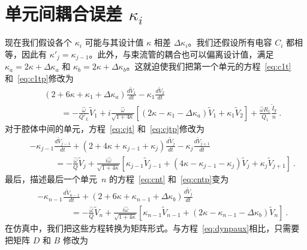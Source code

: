 \documentclass[12pt]{article}
\newcommand\tV{\tilde V}
\newcommand\ho{\hat\omega}
\newcommand\Dk{\Delta\kappa}
\begin{document}
\section{单元间耦合误差 $\kappa_i$}
\label{sec:kappa}
%
现在我们假设各个 $\kappa_i$ 可能与其设计值 $\kappa$ 相差 $\Dk_i$。我们还假设所有电容 $C_i$ 都相等，因此有 $\kappa'_j=\kappa_{j-1}$。此外，与束流管的耦合也可以偏离设计值，满足 $\kappa_a=2\kappa+\Delta\kappa_a$ 和 $\kappa_b=2\kappa+\Delta\kappa_b$。这就迫使我们把第一个单元的方程~\ref{eq:c1t} 和~\ref{eq:c1tp}修改为
\begin{eqnarray}\label{eq:c1tk}
  &&\left(2+6\kappa+\kappa_1+\Dk_a\right)\frac{d\tV_1}{dt} -\kappa_1\frac{d\tV_2}{dt}\\
  &&\qquad=-\frac{\ho}{Q'_L}\tV_1
         +i\frac{\ho}{\sqrt{1+4\kappa}}\left[(2\kappa-\kappa_1-\Dk_a)\tV_1+\kappa_1\tV_2\right]
         + \frac{\ho R_1}{Q_1}\frac{\tilde I_g}{n}\ .\nonumber
\end{eqnarray}
对于腔体中间的单元，方程~\ref{eq:cjt} 和~\ref{eq:cjtp}修改为
\begin{eqnarray}\label{eq:cjtk}
  &&-\kappa_{j-1} \frac{d\tV_{j-1}}{dt}
     +\left(2+4\kappa+\kappa_{j-1}+\kappa_j\right)\frac{d\tV_j}{dt}
  -\kappa_j \frac{d\tV_{j+1}}{dt}\\
   &&\qquad\quad = -\frac{\ho}{Q}\tV_j+\frac{i\ho}{\sqrt{1+4\kappa}}\left[\kappa_{j-1}\tV_{j-1}
      +\left(4\kappa-\kappa_{j-1}-\kappa_j\right)\tV_j+\kappa_j\tV_{j+1} \right]\ .\nonumber
\end{eqnarray}
最后，描述最后一个单元~$n$ 的方程~\ref{eq:cnt} 和~\ref{eq:cntp}变为
\begin{eqnarray}\label{eq:cntk}
  &&-\kappa_{n-1} \frac{d\tV_{n-1}}{dt}
  +\left(2+6\kappa+\kappa_{n-1}+\Dk_b\right)\frac{d\tV_j}{dt} \\
   &&\qquad\qquad = -\frac{\ho}{Q}\tV_n +\frac{i\ho}{\sqrt{1+4\kappa}}\left[\kappa_{n-1}\tV_{n-1}
      +\left(2\kappa-\kappa_{n-1}-\Dk_b\right)\tV_n\right]\ .\nonumber
\end{eqnarray}
在仿真中，我们把这些方程转换为矩阵形式。与方程~\ref{eq:dynpaux}相比，只需要把矩阵 $D$ 和 $B$ 修改为
\end{document}
